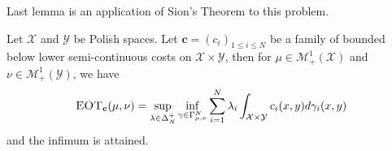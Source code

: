 
Last lemma is an application of Sion's Theorem to this problem.
\begin{lemma}
\label{lem:technical-lemma-primal}
Let $\mathcal{X}$ and $\mathcal{Y}$ be Polish spaces. Let $\mathbf{c}=(c_i)_{1\leq i\leq N}$ be a family of bounded below lower semi-continuous costs on $\mathcal{X}\times \mathcal{Y}$, then for $\mu\in\mathcal{M}^1_+(\mathcal{X})$ and  $\nu\in\mathcal{M}^1_+(\mathcal{Y})$, we have
\begin{align}
\label{eq:supinf}
\textsc{EOT}_{\mathbf{c}}(\mu,\nu)= \sup_{\lambda\in\Delta_N^{+}}\inf_{\gamma\in\Gamma_{\mu,\nu}^N} \sum_{i=1}^N\lambda_i\int_{\mathcal{X}\times\mathcal{Y}}c_i(x,y)d\gamma_i(x,y)
\end{align}
and the infimum is attained.
\end{lemma}
